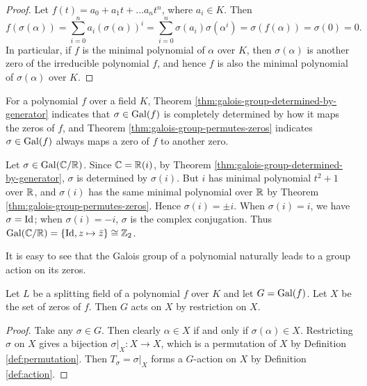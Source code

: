 \begin{proof}
	Let $f(t) = a_0 + a_1 t + \dots a_n t^n$, where $a_i \in K$. Then $$f(\sigma(\alpha)) = \sum_{i=0}^n a_i \left( \sigma (\alpha) \right)^i
	= \sum_{i=0}^n \sigma(a_i)  \sigma (\alpha ^ i) 
	= \sigma(f(\alpha)) = \sigma(0) = 0. $$
	In particular, if $f$ is the minimal polynomial of $\alpha$ over $K$, then $\sigma(\alpha)$ is another zero of the irreducible polynomial $f$, and hence $f$ is also the minimal polynomial of $\sigma(\alpha)$ over $K$. 
\end{proof}



For a polynomial $f$ over a field $K$, Theorem \ref{thm:galois-group-determined-by-generator} indicates that $\sigma \in \operatorname{Gal}(f)$ is completely determined by how it maps the zeros of $f$, and Theorem \ref{thm:galois-group-permutes-zeros} indicates $\sigma \in \operatorname{Gal}(f)$ always maps a zero of $f$ to another zero.

\begin{example}
	Let $\sigma \in \operatorname{Gal}(\mathbb C/\mathbb R)$. Since $\mathbb C= \mathbb R(i)$, by Theorem \ref{thm:galois-group-determined-by-generator}, $\sigma$ is determined by $\sigma(i)$. But $i$ has minimal polynomial $t^2 + 1$ over $\mathbb R$, and $\sigma(i)$ has the same minimal polynomial over $\mathbb R$ by Theorem \ref{thm:galois-group-permutes-zeros}. Hence $\sigma(i) = \pm i$. When $\sigma(i) = i$, we have $\sigma = \operatorname{Id}$; when $\sigma(i) = -i$, $\sigma$ is the complex conjugation. Thus $\operatorname{Gal}(\mathbb C / \mathbb R) = \{\operatorname{Id}, z \mapsto \bar z \} \cong \mathbb Z_2$. 
\end{example}

It is easy to see that the Galois group of a polynomial naturally leads to a group action on its zeros. 


\begin{theorem} \label{thm:galois-group-acts-on-zeros}
	Let $L$ be a splitting field of a polynomial $f$ over $K$ and let $G = \operatorname{Gal}(f)$. Let $X$ be the set of zeros of $f$. Then $G$ acts on $X$ by restriction on $X$. 
\end{theorem}

\begin{proof}
	Take any $\sigma \in G$. Then clearly $\alpha \in X$ if and only if $\sigma(\alpha) \in X$. Restricting $\sigma$ on $X$ gives a bijection $\sigma | _X : X \to X$, which is a permutation of $X$ by Definition \ref{def:permutation}. Then $T_\sigma  = \sigma | _X$ forms a $G$-action on $X$ by Definition \ref{def:action}.  
\end{proof}


